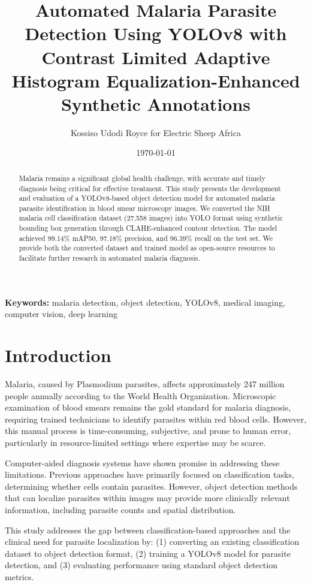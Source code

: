 \documentclass[10pt,twocolumn]{article}
\title{Automated Malaria Parasite Detection Using YOLOv8 with Contrast Limited Adaptive Histogram Equalization-Enhanced Synthetic Annotations}
\author{Kossiso Udodi Royce for Electric Sheep Africa}
\date{\today}
\begin{document}
\maketitle

\begin{abstract}
Malaria remains a significant global health challenge, with accurate and timely diagnosis being critical for effective treatment. This study presents the development and evaluation of a YOLOv8-based object detection model for automated malaria parasite identification in blood smear microscopy images. We converted the NIH malaria cell classification dataset (27,558 images) into YOLO format using synthetic bounding box generation through CLAHE-enhanced contour detection. The model achieved 99.14\% mAP50, 97.18\% precision, and 96.39\% recall on the test set. We provide both the converted dataset and trained model as open-source resources to facilitate further research in automated malaria diagnosis.
\end{abstract}

\textbf{Keywords:} malaria detection, object detection, YOLOv8, medical imaging, computer vision, deep learning

\section{Introduction}

Malaria, caused by Plasmodium parasites, affects approximately 247 million people annually according to the World Health Organization. Microscopic examination of blood smears remains the gold standard for malaria diagnosis, requiring trained technicians to identify parasites within red blood cells. However, this manual process is time-consuming, subjective, and prone to human error, particularly in resource-limited settings where expertise may be scarce.

Computer-aided diagnosis systems have shown promise in addressing these limitations. Previous approaches have primarily focused on classification tasks, determining whether cells contain parasites. However, object detection methods that can localize parasites within images may provide more clinically relevant information, including parasite counts and spatial distribution.

This study addresses the gap between classification-based approaches and the clinical need for parasite localization by: (1) converting an existing classification dataset to object detection format, (2) training a YOLOv8 model for parasite detection, and (3) evaluating performance using standard object detection metrics.
\end{document}
